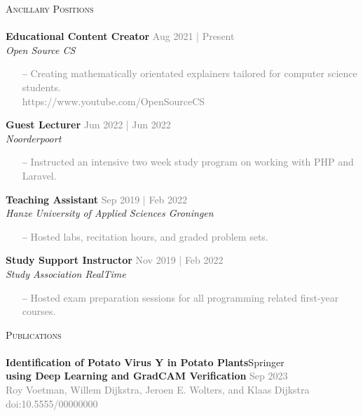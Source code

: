 \documentclass[a4paper]{article}
\newcommand{\lineunder} {
    \vspace*{-8pt} \\
    \hspace*{-18pt} \hrulefill \\
}
\newcommand{\header} [1] {
    {\hspace*{-18pt}\vspace*{6pt} \textsc{#1}}
    \vspace*{-6pt} \lineunder
}
\begin{document}
\vspace{5mm}

\header{Ancillary Positions}
\vspace{1mm}
\textbf{Educational Content Creator} \hfill \textcolor{gray}{Aug 2021 | Present}\\
\textit{Open Source CS}\\
\vspace{-2mm}
\begin{itemize} \itemsep 1pt
	\item[--] \textcolor{gray}{Creating mathematically orientated explainers tailored for computer science students.}\\
		\textcolor{gray}{https://www.youtube.com/OpenSourceCS}
\end{itemize}
\textbf{Guest Lecturer} \hfill \textcolor{gray}{Jun 2022 | Jun 2022}\\
\textit{Noorderpoort}\\
\vspace{-2mm}
\begin{itemize} \itemsep 1pt
	\item[--] \textcolor{gray}{Instructed an intensive two week study program on working with PHP and Laravel.}
\end{itemize}
\textbf{Teaching Assistant} \hfill \textcolor{gray}{Sep 2019 | Feb 2022}\\
\textit{Hanze University of Applied Sciences Groningen}\\
\vspace{-2mm}
\begin{itemize} \itemsep 1pt
	\item[--] \textcolor{gray}{Hosted labs, recitation hours, and graded problem sets.}
\end{itemize}
\textbf{Study Support Instructor} \hfill \textcolor{gray}{Nov 2019 | Feb 2022}\\
\textit{Study Association RealTime}\\
\vspace{-2mm}
\begin{itemize} \itemsep 1pt
	\item[--] \textcolor{gray}{Hosted exam preparation sessions for all programming related first-year courses.}
\end{itemize}

\vspace{5mm}

\header{Publications}

\textbf{Identification of Potato Virus Y in Potato Plants}\hfill Springer\\
\small{\textbf{using Deep Learning and GradCAM Verification} \hfill \textcolor{gray}{Sep 2023}}\\
\footnotesize{\textcolor{gray}{Roy Voetman, Willem Dijkstra, Jeroen E. Wolters, and Klaas Dijkstra} \hfill
\textcolor{gray}{doi:10.5555/00000000}}\\
\normalsize
\vspace{2mm}
\end{document}
